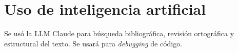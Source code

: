 \section{Uso de inteligencia artificial}
\vspace{- 3 mm}
Se usó la LLM Claude para búsqueda bibliográfica, revisión ortográfica y estructural del texto. Se usará para \textit{debugging} de código.
















